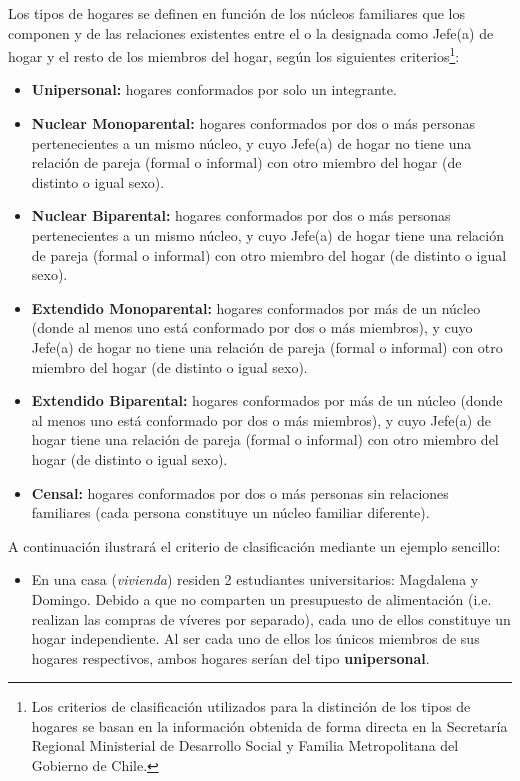 \documentclass[12pt,letterpaper,spanish]{article}
\begin{document}
\begin{enumerate}
Los tipos de hogares se definen en función de los núcleos familiares que los componen y de las relaciones existentes entre el o la designada como Jefe(a) de hogar y el resto de los miembros del hogar, según los siguientes criterios\footnote{Los criterios de clasificación utilizados para la distinción de los tipos de hogares se basan en la información obtenida de forma directa en la Secretaría Regional Ministerial de Desarrollo Social y Familia Metropolitana del Gobierno de Chile.}:

\begin{itemize}
    \item \textbf{Unipersonal:} hogares conformados por solo un integrante.
    
    \item \textbf{Nuclear Monoparental:} hogares conformados por dos o más personas pertenecientes a un mismo núcleo, y cuyo Jefe(a) de hogar no tiene una relación de pareja (formal o informal) con otro miembro del hogar (de distinto o igual sexo).
    
    \item \textbf{Nuclear Biparental:} hogares conformados por dos o más personas pertenecientes a un mismo núcleo, y cuyo Jefe(a) de hogar tiene una relación de pareja (formal o informal) con otro miembro del hogar (de distinto o igual sexo).
    
    \item \textbf{Extendido Monoparental:} hogares conformados por más de un núcleo (donde al menos uno está conformado por dos o más miembros), y cuyo Jefe(a) de hogar no tiene una relación de pareja (formal o informal) con otro miembro del hogar (de distinto o igual sexo).
    
    \item \textbf{Extendido Biparental:} hogares conformados por más de un núcleo (donde al menos uno está conformado por dos o más miembros), y cuyo Jefe(a) de hogar tiene una relación de pareja (formal o informal) con otro miembro del hogar (de distinto o igual sexo).
    
    \item \textbf{Censal:} hogares conformados por dos o más personas sin relaciones familiares (cada persona constituye un núcleo familiar diferente).
\end{itemize}

A continuación ilustrará el criterio de clasificación mediante un ejemplo sencillo:

\begin{itemize}
    \item En una casa (\textit{vivienda}) residen 2 estudiantes universitarios: Magdalena y Domingo. Debido a que no comparten un presupuesto de alimentación (i.e. realizan las compras de víveres por separado),  cada uno de ellos constituye un hogar independiente. Al ser cada uno de ellos los únicos miembros de sus hogares respectivos, ambos hogares serían del tipo \textbf{unipersonal}.
    

\end{itemize}
\end{enumerate}
\end{document}

